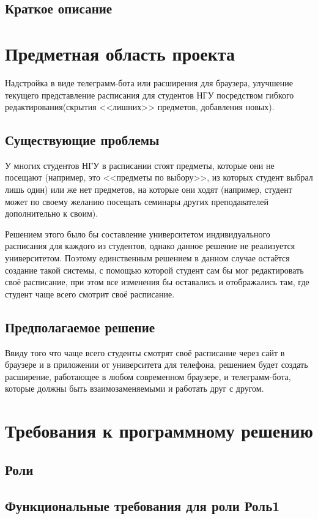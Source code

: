 \documentclass[a4paper]{report}
\begin{document}
		\section{Краткое описание}	
	\chapter{Предметная область проекта}
		Надстройка в виде телеграмм-бота или расширения для браузера, улучшение текущего представление расписания для студентов НГУ посредством гибкого редактирования(скрытия <<лишних>> предметов, добавления новых).
	
		\section{Существующие проблемы}
			У многих студентов НГУ в расписании стоят предметы, которые они не посещают (например, это <<предметы по выбору>>, из которых студент выбрал лишь один) или же нет предметов, на которые они ходят (например, студент может по своему желанию посещать семинары других преподавателей дополнительно к своим).
			
			Решением этого было бы составление университетом индивидуального расписания для каждого из студентов, однако данное решение не реализуется университетом. Поэтому единственным решением в данном случае остаётся создание такой системы, с помощью которой студент сам бы мог редактировать своё расписание, при этом все изменения бы оставались и отображались там, где студент чаще всего смотрит своё расписание. 
		\section{Предполагаемое решение}
			Ввиду того что чаще всего студенты смотрят своё расписание через сайт в браузере и в приложении от университета для телефона, решением будет создать расширение, работающее в любом современном браузере, и телеграмм-бота, которые должны быть взаимозаменяемыми и работать друг с другом.
	\chapter{Требования к программному решению}
		\section{Роли}
		
		\section{Функциональные требования для роли Роль1}
\end{document}
